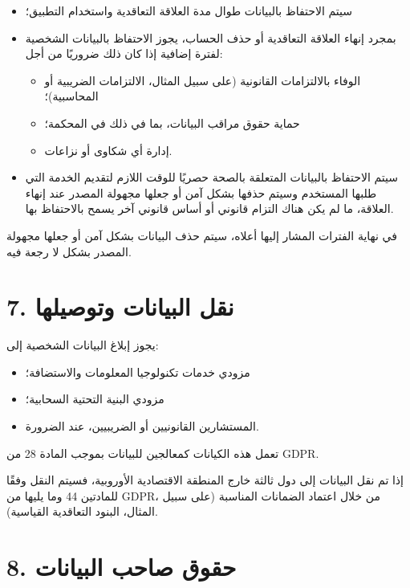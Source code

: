 \documentclass[a4paper,12pt]{article}
\begin{document}
    \begin{itemize}
        \item سيتم الاحتفاظ بالبيانات طوال مدة العلاقة التعاقدية واستخدام التطبيق؛

        \item بمجرد إنهاء العلاقة التعاقدية أو حذف الحساب، يجوز الاحتفاظ بالبيانات الشخصية لفترة إضافية إذا كان ذلك ضروريًا من أجل:
        \begin{itemize}
            \item الوفاء بالالتزامات القانونية (على سبيل المثال، الالتزامات الضريبية أو المحاسبية)؛
            \item حماية حقوق مراقب البيانات، بما في ذلك في المحكمة؛
            \item إدارة أي شكاوى أو نزاعات.
        \end{itemize}

        \item سيتم الاحتفاظ بالبيانات المتعلقة بالصحة حصريًا للوقت اللازم لتقديم الخدمة التي طلبها المستخدم وسيتم حذفها بشكل آمن أو جعلها مجهولة المصدر عند إنهاء العلاقة، ما لم يكن هناك التزام قانوني أو أساس قانوني آخر يسمح بالاحتفاظ بها.
    \end{itemize}

    في نهاية الفترات المشار إليها أعلاه، سيتم حذف البيانات بشكل آمن أو جعلها مجهولة المصدر بشكل لا رجعة فيه.

    \section*{7. نقل البيانات وتوصيلها}

    يجوز إبلاغ البيانات الشخصية إلى:

    \begin{itemize}
        \item مزودي خدمات تكنولوجيا المعلومات والاستضافة؛
        \item مزودي البنية التحتية السحابية؛
        \item المستشارين القانونيين أو الضريبيين، عند الضرورة.
    \end{itemize}

    تعمل هذه الكيانات كمعالجين للبيانات بموجب المادة 28 من GDPR.

    إذا تم نقل البيانات إلى دول ثالثة خارج المنطقة الاقتصادية الأوروبية، فسيتم النقل وفقًا للمادتين 44 وما يليها من GDPR، من خلال اعتماد الضمانات المناسبة (على سبيل المثال، البنود التعاقدية القياسية).

    \section*{8. حقوق صاحب البيانات}
\end{document}
